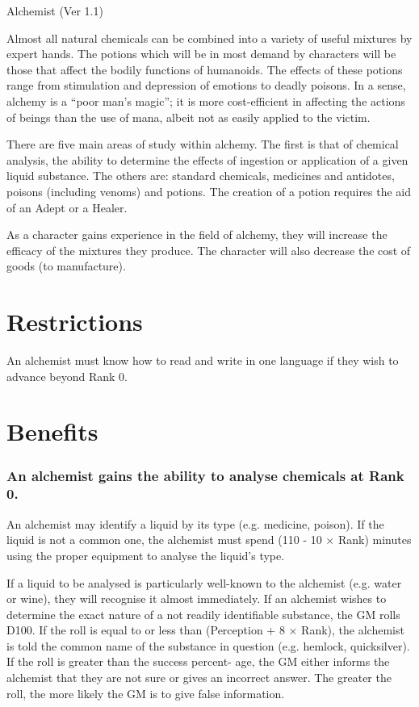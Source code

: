 \begin{Chapter}{Alchemist (Ver 1.1)}

Almost all natural chemicals can be combined into a variety of useful
mixtures by expert hands.  The potions which will be in most demand by
characters will be those that affect the bodily functions of
humanoids. The effects of these potions range from stimulation and
depression of emotions to deadly poisons.  In a sense, alchemy is a
“poor man’s magic”; it is more cost-efficient in affecting the actions
of beings than the use of mana, albeit not as easily applied to the
victim.

There are five main areas of study within alchemy.  The first is that
of chemical analysis, the ability to determine the effects of
ingestion or application of a given liquid substance.  The others are:
standard chemicals, medicines and antidotes, poisons (including
venoms) and potions.  The creation of a potion requires the aid of an
Adept or a Healer.

As a character gains experience in the field of alchemy, they will
increase the efficacy of the mixtures they produce.  The character
will also decrease the cost of goods (to manufacture).

\section{Restrictions}

An alchemist must know how to read and write in one language if they
wish to advance beyond Rank 0.

\section{Benefits}

\subsubsection{An alchemist gains the ability to analyse chemicals at Rank 0.}

An alchemist may identify a liquid by its type (e.g.  medicine,
poison).  If the liquid is not a common one, the alchemist must spend
(110 - 10 × Rank) minutes using the proper equipment to analyse the
liquid’s type.

If a liquid to be analysed is particularly well-known to the alchemist
(e.g.  water or wine), they will recognise it almost immediately.  If
an alchemist wishes to determine the exact nature of a not readily
identifiable substance, the GM rolls D100.  If the roll is equal to or
less than (Perception + 8 × Rank), the alchemist is told the common
name of the substance in question (e.g. hemlock, quicksilver).  If
the roll is greater than the success percent- age, the GM either
informs the alchemist that they are not sure or gives an incorrect
answer.  The greater the roll, the more likely the GM is to give false
information.


\end{Chapter}
